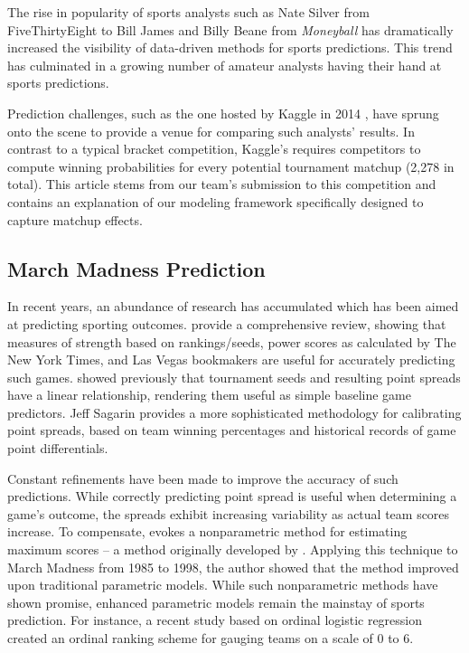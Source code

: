 \documentclass[letterpaper,12pt]{article}
\begin{document}
The rise in popularity of sports analysts such as Nate Silver from FiveThirtyEight \citep{silver} to Bill James \citep{james} and Billy Beane from \emph{Moneyball} \citep{moneyball} has dramatically increased the visibility of data-driven methods for sports predictions. This trend has culminated in a growing number of amateur analysts having their hand at sports predictions. 

Prediction challenges, such as the one hosted by Kaggle in 2014 \citep{kaggle}, have sprung onto the scene to provide a venue for comparing such analysts' results. 
In contrast to a typical bracket competition, Kaggle's requires competitors to compute winning probabilities for every potential tournament matchup (2,278 in total). This article stems from our team's submission to this competition and contains an explanation of our modeling framework specifically designed to capture matchup effects. 
\subsection{March Madness Prediction \label{methods_review}}
In recent years, an abundance of research has accumulated which has been aimed at predicting sporting outcomes. \cite{boulier2003predicting} provide a comprehensive review, showing that measures of strength based on  rankings/seeds, power scores as calculated by The New York Times,  and Las Vegas bookmakers are useful for accurately predicting such games. \cite{smith1999can} showed previously that tournament seeds and resulting point spreads have a linear relationship, rendering them useful as simple baseline game predictors. Jeff Sagarin \citep{sagarin} provides a more sophisticated methodology for calibrating point spreads, based on team winning percentages and historical records of game point differentials. 

Constant refinements have been made to improve the accuracy of such predictions. While correctly predicting point spread is useful when determining a game's outcome, the spreads exhibit increasing variability as actual team scores increase. To compensate, 
\cite{caudill2003predicting} evokes a nonparametric method for estimating maximum scores -- a method originally developed by \cite{manski1977estimation}.
Applying this technique to March Madness from 1985 to 1998, the author showed that the method improved upon traditional parametric models. While such nonparametric methods have shown promise, enhanced parametric models remain the mainstay of sports prediction. For instance, a recent study based on ordinal logistic regression \citep{west2006simple} created an ordinal ranking scheme for gauging teams on a scale of 0 to 6. 
\end{document}

